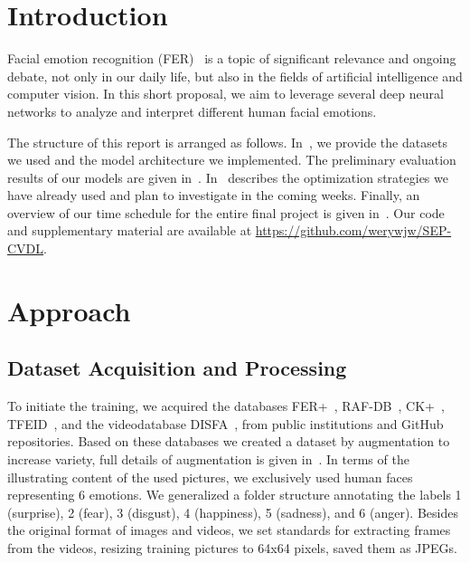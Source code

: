 \section{Introduction}
\label{sec:intro}

Facial emotion recognition (FER)~\cite{Ko18} is a topic of significant relevance and ongoing debate, not only in our daily life, but also in the fields of artificial intelligence and computer vision.
In this short proposal, we aim to leverage several deep neural networks to analyze and interpret different human facial emotions. 

The structure of this report is arranged as follows. 
In~, 
we provide the datasets we used and the model architecture we implemented. 
The preliminary evaluation results of our models are given in~. 
In~ describes the optimization strategies we have already used and plan to investigate in the coming weeks. 
Finally,
an overview of our time schedule for the entire final project is given in~. 
Our code and supplementary material are available at \url{https://github.com/werywjw/SEP-CVDL}.


\section{Approach}
\label{sec:approach}

\subsection{Dataset Acquisition and Processing}
\label{sec:datasets}
To initiate the training, 
we acquired the databases FER+~\cite{BarsoumZCZ16}, RAF-DB~\cite{li_reliable_2017,li2019reliable}, CK+~\cite{LuceyCKSAM10}, TFEID~\cite{tfeid}, and the videodatabase DISFA~\cite{MavadatiMBTC13}, 
from public institutions and GitHub repositories.
Based on these databases we created a dataset by augmentation to increase variety, 
full details of augmentation is given in~. 
In terms of the illustrating content of the used pictures, we exclusively used human faces representing 6 emotions. 
We generalized a folder structure annotating the labels 1 (surprise), 2 (fear), 3 (disgust), 4 (happiness), 5 (sadness), and 6 (anger). 
Besides the original format of images and videos, we set standards for extracting frames from the videos, resizing training pictures to 64x64 pixels, saved them as JPEGs.

